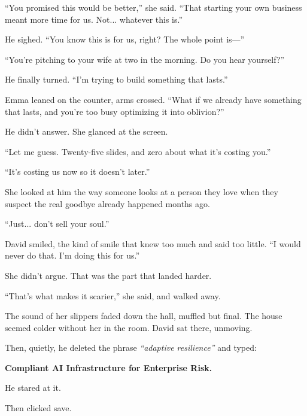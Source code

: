 “You promised this would be better,” she said. “That starting your own business meant more time for us. Not... 
whatever this is.”

He sighed. “You know this is for us, right? The whole point is—”

“You’re pitching to your wife at two in the morning. Do you hear yourself?”

He finally turned. “I’m trying to build something that lasts.”

Emma leaned on the counter, arms crossed. “What if we already have something that lasts, and you’re too busy optimizing 
it into oblivion?”

He didn’t answer. She glanced at the screen.

“Let me guess. Twenty-five slides, and zero about what it’s costing you.”

“It’s costing us now so it doesn’t later.”

She looked at him the way someone looks at a person they love when they suspect the real goodbye already 
happened months ago.

“Just... don’t sell your soul.”

David smiled, the kind of smile that knew too much and said too little. “I would never do that. I’m doing this for us.”

She didn’t argue. That was the part that landed harder.

“That’s what makes it scarier,” she said, and walked away.

The sound of her slippers faded down the hall, muffled but final. The house seemed colder without her in the room. 
David sat there, unmoving.

Then, quietly, he deleted the phrase \textit{“adaptive resilience”} and typed:

\textbf{Compliant AI Infrastructure for Enterprise Risk.}

He stared at it.

Then clicked save.


\medskip

